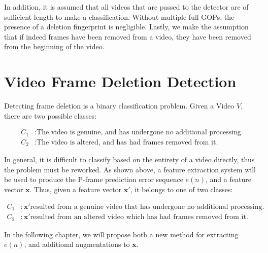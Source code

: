 In addition, it is assumed that all videos that are passed to the detector are of sufficient length to make a classification. Without multiple full GOPs, the presence of a deletion fingerprint is negligible. Lastly, we make the assumption that if indeed frames have been removed from a video, they have been removed from the beginning of the video.

\section{Video Frame Deletion Detection}

Detecting frame deletion is a binary classification problem. Given a Video $V$, there are two possible classes:

\begin{equation}
\begin{aligned}
  C_{1} &: \text{The video is genuine, and has undergone no additional processing.} \\
  C_{2} &: \text{The video is altered, and has had frames removed from it.}
\end{aligned}
\end{equation}

In general, it is difficult to classify based on the entirety of a video directly, thus the problem must be reworked. As shown above, a feature extraction system will be used to produce the P-frame prediction error sequence $e(n)$, and a feature vector $\bm{x}$. Thus, given a feature vector $\bm{x}'$, it belongs to one of two classes:

\begin{equation}
\begin{aligned}
  C_{1} &: \bm{x}' \text{resulted from a genuine video that has undergone no additional processing.} \\
  C_{2} &: \bm{x}' \text{resulted from an altered video which has had frames removed from it.}
\end{aligned}
\end{equation}

In the following chapter, we will propose both a new method for extracting $e(n)$, and additional augmentations to $\bm{x}$.
